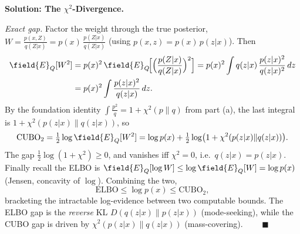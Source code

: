 \documentclass[12pt]{article}
\newcommand{\E}{\field{E}}
\renewcommand{\E}{\field{E}}
\begin{document}
\begin{enumerate}
\begin{solution}{\bf Solution: The $\chi^2$-Divergence.}
\begin{enumerate}
\emph{Exact gap.} Factor the weight through the true posterior, $W=\frac{p(x,Z)}{q(Z|x)}=p(x)\,\frac{p(Z|x)}{q(Z|x)}$ (using $p(x,z)=p(x)\,p(z|x)$). Then
\[
\begin{aligned}
    \E_Q[W^2]&=p(x)^2\,\E_Q\!\Big[\Big(\frac{p(Z|x)}{q(Z|x)}\Big)^2\Big]
    =p(x)^2\int q(z|x)\,\frac{p(z|x)^2}{q(z|x)^2}\,dz\\
    &=p(x)^2\int\frac{p(z|x)^2}{q(z|x)}\,dz.
\end{aligned}
\]
By the foundation identity $\int\frac{p^2}{q}=1+\chi^2(p\|q)$ from part (a), the last integral is $1+\chi^2(p(z|x)\|q(z|x))$, so
\[
    \mathrm{CUBO}_2=\tfrac12\log\E_Q[W^2]=\log p(x)+\tfrac12\log\!\big(1+\chi^2(p(z|x)\|q(z|x))\big).
\]
The gap $\tfrac12\log(1+\chi^2)\ge0$, and vanishes iff $\chi^2=0$, i.e.~$q(z|x)=p(z|x)$. Finally recall the ELBO is $\E_Q[\log W]\le\log\E_Q[W]=\log p(x)$ (Jensen, concavity of $\log$). Combining the two,
\[
    \mathrm{ELBO}\le\log p(x)\le\mathrm{CUBO}_2,
\]
bracketing the intractable log-evidence between two computable bounds. The ELBO gap is the \emph{reverse} KL $D(q(z|x)\|p(z|x))$ (mode-seeking), while the CUBO gap is driven by $\chi^2(p(z|x)\|q(z|x))$ (mass-covering). $\qquad\blacksquare$
\end{enumerate}
\end{solution}
\end{enumerate}

\begin{problem}
    \newpage~\newpage~\newpage~
\end{problem}
\end{document}

